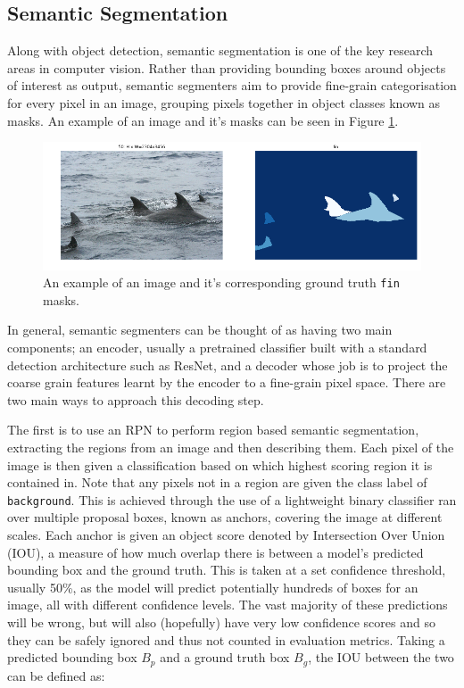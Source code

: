 \subsection{Semantic Segmentation}\label{ch:Background,sec:semanticSegmentation}
Along with object detection, semantic segmentation is one of the key research areas in computer vision. Rather than providing bounding boxes around objects of interest as output, semantic segmenters aim to provide fine-grain categorisation for every pixel in an image, grouping pixels together in object classes known as masks. An example of an image and it's masks can be seen in Figure \ref{fig:masks-example}.

\begin{figure}
	\begin{center}
		\includegraphics[scale=0.5]{Chapter2/figs/masks-example.png}
	\end{center}
	\caption{An example of an image and it's corresponding ground truth \texttt{fin} masks.}
	\label{fig:masks-example}
\end{figure}

In general, semantic segmenters can be thought of as having two main components; an encoder, usually a pretrained classifier built with a standard detection architecture such as ResNet, and a decoder whose job is to project the coarse grain features learnt by the encoder to a fine-grain pixel space. There are two main ways to approach this decoding step.

The first is to use an RPN to perform region based semantic segmentation, extracting the regions from an image and then describing them. Each pixel of the image is then given a classification based on which highest scoring region it is contained in. Note that any pixels not in a region are given the class label of \texttt{background}. This is achieved through the use of a lightweight binary classifier ran over multiple proposal boxes, known as anchors, covering the image at different scales. Each anchor is given an object score denoted by Intersection Over Union (IOU), a measure of how much overlap there is between a model's predicted bounding box and the ground truth. This is taken at a set confidence threshold, usually 50\%, as the model will predict potentially hundreds of boxes for an image, all with different confidence levels. The vast majority of these predictions will be wrong, but will also (hopefully) have very low confidence scores and so they can be safely ignored and thus not counted in evaluation metrics. Taking a predicted bounding box $B_p$ and a ground truth box $B_g$, the IOU between the two can be defined as:

